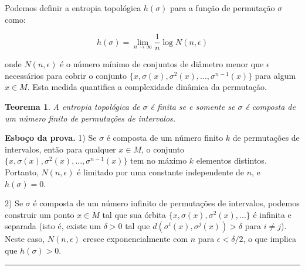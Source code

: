 \documentclass[12pt,a4paper]{article}
\newtheorem{theorem}{Teorema}
\newenvironment{proof}[1][Prova]{\textbf{#1.} }{\ \rule{0.5em}{0.5em}}
\begin{document}
Podemos definir a entropia topológica $h(\sigma)$ para a função de permutação $\sigma$ como:

\begin{equation}
h(\sigma) = \lim_{n \to \infty} \frac{1}{n} \log N(n, \epsilon)
\end{equation}

onde $N(n, \epsilon)$ é o número mínimo de conjuntos de diâmetro menor que $\epsilon$ necessários para cobrir o conjunto $\{x, \sigma(x), \sigma^2(x), ..., \sigma^{n-1}(x)\}$ para algum $x \in M$. Esta medida quantifica a complexidade dinâmica da permutação.

\begin{theorem}
A entropia topológica de $\sigma$ é finita se e somente se $\sigma$ é composta de um número finito de permutações de intervalos.
\end{theorem}

\begin{proof}[Esboço da prova]
1) Se $\sigma$ é composta de um número finito $k$ de permutações de intervalos, então para qualquer $x \in M$, o conjunto $\{x, \sigma(x), \sigma^2(x), ..., \sigma^{n-1}(x)\}$ tem no máximo $k$ elementos distintos. Portanto, $N(n, \epsilon)$ é limitado por uma constante independente de $n$, e $h(\sigma) = 0$.

2) Se $\sigma$ é composta de um número infinito de permutações de intervalos, podemos construir um ponto $x \in M$ tal que sua órbita $\{x, \sigma(x), \sigma^2(x), ...\}$ é infinita e separada (isto é, existe um $\delta > 0$ tal que $d(\sigma^i(x), \sigma^j(x)) > \delta$ para $i \neq j$). Neste caso, $N(n, \epsilon)$ cresce exponencialmente com $n$ para $\epsilon < \delta/2$, o que implica que $h(\sigma) > 0$.
\end{proof}
   
\end{document}
